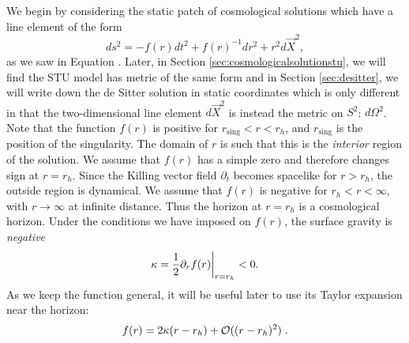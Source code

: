 We begin by considering the static patch of cosmological solutions which have a line element of the form
\begin{equation}
\label{eq:kruskalgen}
    ds^2 = -f(r) dt^2 + f(r)^{-1} dr^2 + r^2 d\vec{X}^2 ,
\end{equation}
as we saw in Equation . Later, in Section \ref{sec:cosmologicalsolutionstu}, we will find the STU model has metric of the same form and in Section \ref{sec:desitter}, we will write down the de Sitter solution in static coordinates which is only different in that the two-dimensional line element $d\vec{X}^2$ is instead the metric on $S^2$: $d\Omega^2$. Note that the function $f(r)$ is positive for $r_{\mathrm{sing}} < r < r_h$, and $r_{\mathrm{sing}}$ is the position of the singularity. The domain of $r$ is such that this is the \emph{interior} region of the solution. We assume that $f(r)$ has a simple zero and therefore changes sign at $r=r_h$. Since the Killing vector field $\partial_t$ becomes spacelike for $r>r_h$, the outside region is dynamical. We assume that $f(r)$ is negative for $r_h < r < \infty$, with  $r\rightarrow \infty$ at infinite distance. Thus the horizon at $r=r_h$ is a cosmological horizon. Under the conditions we have imposed on $f(r)$, the surface gravity is \emph{negative}
	\begin{equation*}
	    \kappa = \frac{1}{2} \partial_r f(r) \bigg|_{r = r_h} < 0.
	\end{equation*}
As we keep the function general, it will be useful later to use its Taylor expansion near the horizon:
	\begin{equation}
	\label{eq:taylorexpansion}
	        f(r) = 2 \kappa (r - r_h) + {\cal O}((r - r_h)^2) \;.
	\end{equation}


